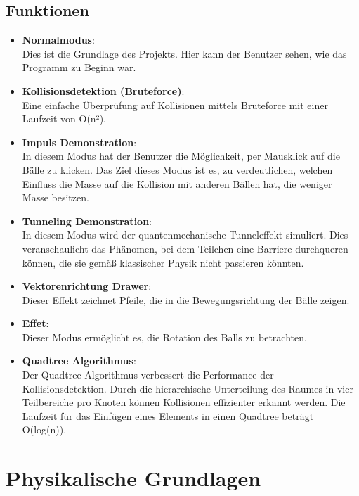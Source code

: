 \documentclass[12pt,a4paper]{article}
\begin{document}
	\subsection{Funktionen}
	\begin{itemize}
		\item \textbf{Normalmodus}:\\
		Dies ist die Grundlage des Projekts. Hier kann der Benutzer sehen, wie das Programm zu Beginn war.
		
		\item \textbf{Kollisionsdetektion (Bruteforce)}:\\
		Eine einfache Überprüfung auf Kollisionen mittels Bruteforce mit einer Laufzeit von O(n²).
		
		\item \textbf{Impuls Demonstration}:\\
		In diesem Modus hat der Benutzer die Möglichkeit, per Mausklick auf die Bälle zu klicken. Das Ziel dieses Modus ist es, zu verdeutlichen, welchen Einfluss die Masse auf die Kollision mit anderen Bällen hat, die weniger Masse besitzen.
		
		\item \textbf{Tunneling Demonstration}:\\
		In diesem Modus wird der quantenmechanische Tunneleffekt simuliert. Dies veranschaulicht das Phänomen, bei dem Teilchen eine Barriere durchqueren können, die sie gemäß klassischer Physik nicht passieren könnten.
		
		\item \textbf{Vektorenrichtung Drawer}:\\
		Dieser Effekt zeichnet Pfeile, die in die Bewegungsrichtung der Bälle zeigen.
		
		\item \textbf{Effet}:\\
		Dieser Modus ermöglicht es, die Rotation des Balls zu betrachten.
		
		\item \textbf{Quadtree Algorithmus}:\\
		Der Quadtree Algorithmus verbessert die Performance der Kollisionsdetektion. Durch die hierarchische Unterteilung des Raumes in vier Teilbereiche pro Knoten können Kollisionen effizienter erkannt werden. Die Laufzeit für das Einfügen eines Elements in einen Quadtree beträgt O(log(n)).
	\end{itemize}
	
	\section{Physikalische Grundlagen}
\end{document}
